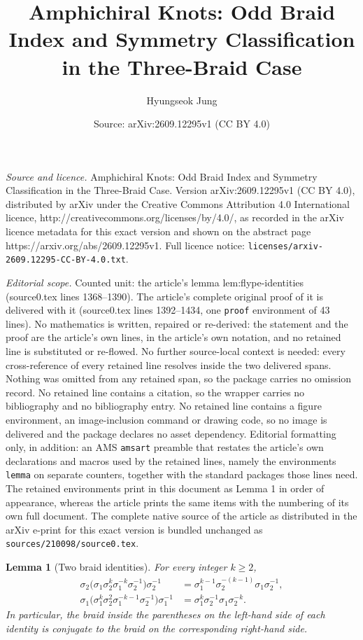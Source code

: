 \documentclass[10pt,a4paper]{amsart}
\title{Amphichiral Knots: Odd Braid Index and Symmetry Classification in the Three-Braid Case}
\author{Hyungseok Jung}
\date{Source: arXiv:2609.12295v1 (CC BY 4.0)}
\newtheorem{lemma}{Lemma}
\begin{document}
\maketitle

\noindent\emph{Source and licence.} Amphichiral Knots: Odd Braid Index and Symmetry Classification in the Three-Braid Case. Version arXiv:2609.12295v1 (CC BY 4.0), distributed by arXiv under the Creative Commons Attribution 4.0 International licence, http://creativecommons.org/licenses/by/4.0/, as recorded in the arXiv licence metadata for this exact version and shown on the abstract page https://arxiv.org/abs/2609.12295v1. Full licence notice: \texttt{licenses/arxiv-2609.12295-CC-BY-4.0.txt}.\par\smallskip

\noindent\textit{Editorial scope.} Counted unit: the article's lemma lem:flype-identities (source0.tex lines 1368--1390). The article's complete original proof of it is delivered with it (source0.tex lines 1392--1434, one \texttt{proof} environment of 43 lines). No mathematics is written, repaired or re-derived: the statement and the proof are the article's own lines, in the article's own notation, and no retained line is substituted or re-flowed.  No further source-local context is needed: every cross-reference of every retained line resolves inside the two delivered spans.  Nothing was omitted from any retained span, so the package carries no omission record.  No retained line contains a citation, so the wrapper carries no bibliography and no bibliography entry.  No retained line contains a figure environment, an image-inclusion command or drawing code, so no image is delivered and the package declares no asset dependency.  Editorial formatting only, in addition: an AMS \texttt{amsart} preamble that restates the article's own declarations and macros used by the retained lines, namely the environments \texttt{lemma} on separate counters, together with the standard packages those lines need.  The retained environments print in this document as Lemma 1 in order of appearance, whereas the article prints the same items with the numbering of its own full document.  The complete native source of the article as distributed in the arXiv e-print for this exact version is bundled unchanged as \texttt{sources/210098/source0.tex}.
\begin{lemma}[Two braid identities]\label{lem:flype-identities}
For every integer $k\ge2$,
\begin{align}
\sigma_2
\bigl(
\sigma_1\sigma_2^k\sigma_1^{-k}\sigma_2^{-1}
\bigr)
\sigma_2^{-1}
&=
\sigma_1^{k-1}\sigma_2^{-(k-1)}\sigma_1\sigma_2^{-1},
\label{eq:flype-identity-one}\\
\sigma_1
\bigl(
\sigma_1^k\sigma_2^2\sigma_1^{-k-1}\sigma_2^{-1}
\bigr)
\sigma_1^{-1}
&=
\sigma_1^k\sigma_2^{-1}\sigma_1\sigma_2^{-k}.
\label{eq:flype-identity-two}
\end{align}
In particular, the braid inside the parentheses on the left-hand side of
each identity is conjugate to the braid on the corresponding right-hand side.
\end{lemma}
\end{document}
